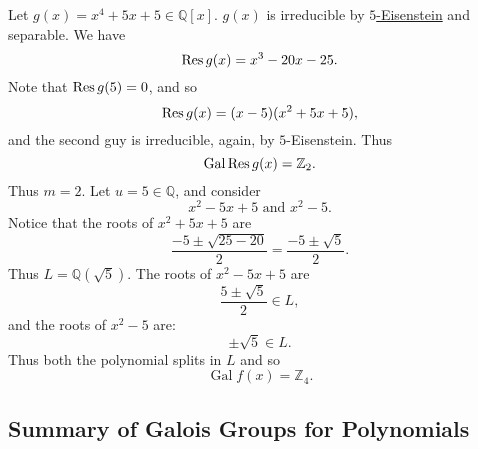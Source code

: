 \documentclass[notoc,notitlepage,nobib]{tufte-book}
\DeclareMathOperator{\Gal}{Gal}
\begin{document}
\begin{eg}
  Let $g(x) = x^4 + 5x + 5 \in \mathbb{Q}[x]$. $g(x)$ is irreducible by
  \hyperref[propo:eisenstein_s_criterion]{$5$-Eisenstein} and separable. We
  have
  \begin{equation*}
    \operatorname{Res} g(x) = x^3 - 20x - 25.
  \end{equation*}
  Note that $\operatorname{Res} g(5) = 0$, and so
  \begin{equation*}
    \operatorname{Res} g(x) = (x - 5)(x^2 + 5x + 5),
  \end{equation*}
  and the second guy is irreducible, again, by $5$-Eisenstein. Thus
  \begin{equation*}
    \Gal \Res{g(x)} = \mathbb{Z}_2.
  \end{equation*}
  Thus $m = 2$. Let $u = 5 \in \mathbb{Q}$, and consider
  \begin{equation*}
    x^2 - 5x + 5 \text{ and } x^2 - 5.
  \end{equation*}
  Notice that the roots of $x^2 + 5x + 5$ are
  \begin{equation*}
    \frac{-5 \pm \sqrt{25 - 20}}{2} = \frac{-5 \pm \sqrt{5}}{2}.
  \end{equation*}
  Thus $L = \mathbb{Q}(\sqrt{5})$. The roots of $x^2 - 5x + 5$ are
   \begin{equation*}
     \frac{5 \pm \sqrt{5}}{2} \in L,
  \end{equation*}
  and the roots of $x^2 - 5$ are:
  \begin{equation*}
    \pm \sqrt{5} \in L.
  \end{equation*}
  Thus both the polynomial splits in $L$ and so
  \begin{equation*}
    \Gal f(x) = \mathbb{Z}_4.
  \end{equation*}
\end{eg}


\subsection{Summary of Galois Groups for Polynomials}%
\label{sub:summary_of_galois_groups_for_polynomials}
\end{document}
